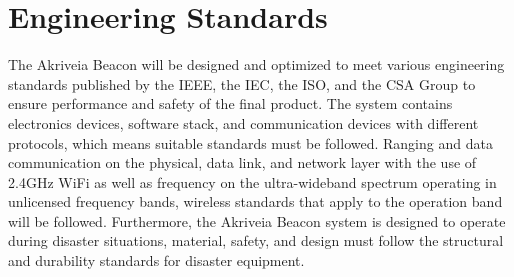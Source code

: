 
\setcounter{section}{2}
\section{Engineering Standards}
\bigskip

The Akriveia Beacon will be designed and optimized to meet various engineering standards published by the IEEE, the IEC, the ISO, and the CSA Group to ensure performance and safety of the final product. The system contains electronics devices, software stack, and communication devices with different protocols, which means suitable standards must be followed. Ranging and data communication on the physical, data link, and network layer with the use of 2.4GHz WiFi as well as frequency on the ultra-wideband spectrum operating in unlicensed frequency bands, wireless standards that apply to the operation band will be followed. Furthermore, the Akriveia Beacon system is designed to operate during disaster situations, material, safety, and design must follow the structural and durability standards for disaster equipment. 

